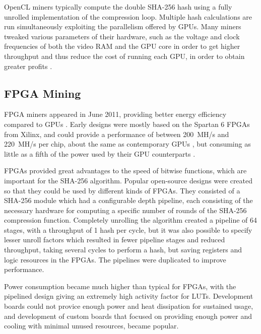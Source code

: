 OpenCL miners typically compute the double SHA-256 hash using a fully unrolled implementation
of the compression loop. Multiple hash calculations are run simultaneously exploiting the parallelism
offered by GPUs. Many miners tweaked various parameters of their hardware, such as the voltage and
clock frequencies of both the video RAM and the GPU core in order to get higher throughput
and thus reduce the cost of running each GPU, in order to obtain greater profits \cite{bespoke-silicon}.

\subsection{FPGA Mining}
\label{sec:fpga-mining}

FPGA miners appeared in June 2011, providing better energy efficiency compared to GPUs \cite{bespoke-silicon}.
Early designs were mostly based on the Spartan 6 FPGAs from Xilinx, and could provide a
performance of between 200~MH/s and 220~MH/s per chip, about the same as contemporary GPUs \cite{bitcoin-hardware-cmp},
but consuming as little as a fifth of the power used by their GPU counterparts \cite{bespoke-silicon}.


FPGAs provided great advantages to the speed of bitwise functions, which are important for
the SHA-256 algorithm. Popular open-source designs were created so that they could be used
by different kinds of FPGAs. They consisted of a SHA-256 module which had a configurable depth pipeline, each
consisting of the necessary hardware for computing a specific number of rounds of the
SHA-256 compression function. Completely unrolling the algorithm created a pipeline of
64 stages, with a throughput of 1 hash per cycle, but it was also possible to specify
lesser unroll factors which resulted in fewer pipeline stages and reduced throughput, taking
several cycles to perform a hash, but saving registers and logic resources in the FPGAs.
The pipelines were duplicated to improve performance.

Power consumption became much higher than typical for FPGAs, with the pipelined design
giving an extremely high activity factor for LUTs. Development boards could not provice enough
power and heat dissipation for sustained usage, and development of custom boards that focused
on providing enough power and cooling with minimal unused resources, became popular. \cite{bespoke-silicon}


